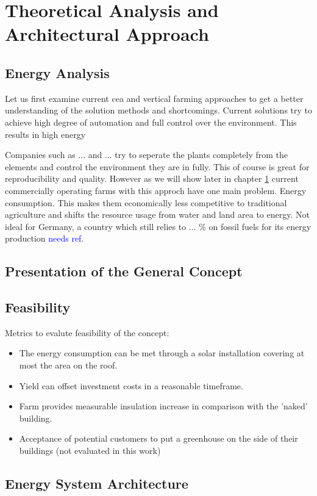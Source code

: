 \chapter{Theoretical Analysis and Architectural Approach}
\label{chap:analysis-and-arch}
%
\section{Energy Analysis}
\label{sec:energy-analysis}
Let us first examine current \ac{cea} and vertical farming approaches to get a better understanding of the solution methods and shortcomings.
Current solutions try to achieve high degree of automation and full control over the environment.
This results in high energy

Companies such as ... and ... try to seperate the plants completely from the elements and control the environment they are in fully.
This of course is great for reproducibility and quality.
However as we will show later in chapter \ref{chap:analysis-and-arch} current commercially operating farms with this approch have one main problem.
Energy consumption.
This makes them economically less competitive to traditional agriculture and shifts the resource usage from water and land area to energy.
Not ideal for Germany, a country which still relies to ... \% on fossil fuels for its energy production \textcolor{blue}{needs ref}.



\section{Presentation of the General Concept}
\label{sec:concept}
\section{Feasibility}
\label{sec:feasibility}
Metrics to evalute feasibility of the concept:
\begin{itemize}
	\item The energy consumption can be met through a solar installation covering at most the area on the roof.
	\item Yield can offset investment costs in a reasonable timeframe.
	\item Farm provides measurable insulation increase in comparison with the 'naked' building.
	\item Acceptance of potential customers to put a greenhouse on the side of their buildings (not evaluated in this work)
\end{itemize}

\section{Energy System Architecture}
\label{sec:architecture}
